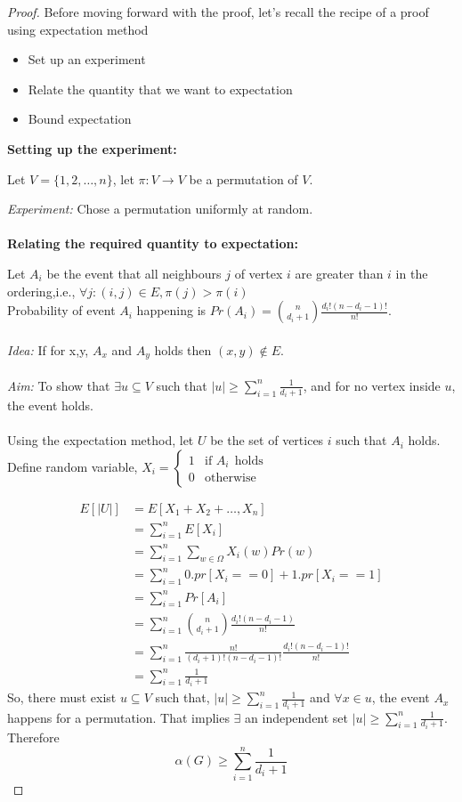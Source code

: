 \begin{proof}
Before moving forward with the proof, let's recall the recipe of a proof using expectation method
\begin{itemize}
  \item Set up an experiment
  \item Relate the quantity that we want to expectation
  \item Bound expectation
\end{itemize}
\textbf{Setting up the experiment:}

Let $V=\{1,2,\dots,n\}$, let $\pi:V\rightarrow V$ be a permutation of $V$.

\textit{Experiment:} Chose a permutation uniformly at random.\\\\
\textbf{Relating the required quantity to expectation:}

Let $A_i$ be the event that all neighbours $j$ of vertex $i$ are greater than $i$ in the ordering,i.e., $\forall j:(i,j)\in E, \pi(j)>\pi(i)$\\
Probability of event $A_i$ happening is $Pr(A_i)=\binom{n}{d_i+1}\frac{d_i!(n-d_i-1)!}{n!}$.\\\\
\textit{Idea:} If for x,y, $A_x$ and $A_y$ holds then $(x,y)\notin E$.\\\\
\textit{Aim:} To show that $\exists u\subseteq V$ such that $|u|\ge\sum_{i=1}^{n}\frac{1}{d_i+1}$, and for no vertex inside $u$, the event holds.\\\\
Using the expectation method, let $U$ be the set of vertices $i$ such that $A_i$ holds.\\
Define random variable,
$X_i =
\left\{
	\begin{array}{ll}
		1  & \mbox{if } A_i ~~\text{holds} \\
		0  & \mbox{otherwise }
	\end{array}
\right.$

\begin{align*}
    E[|U|] &= E[X_1+X_2+\dots,X_n]\\
           &= \sum_{i=1}^{n}E[X_i] \\
           &= \sum_{i=1}^{n}\sum_{w\in\Omega}X_i(w)Pr(w) \\
           &= \sum_{i=1}^{n}0.pr[X_i==0]+1.pr[X_i==1] \\
           &= \sum_{i=1}^{n}Pr[A_i] \\
           &= \sum_{i=1}^{n}\binom{n}{d_i+1}\frac{d_i!(n-d_i-1)}{n!}\\
           &= \sum_{i=1}^{n}\frac{n!}{(d_i+1)!(n-d_i-1)!}\frac{d_i!(n-d_i-1)!}{n!}\\
           &= \sum_{i=1}^{n}\frac{1}{d_i+1}
\end{align*}
So, there must exist $u\subseteq V$ such that, $|u|\ge \sum_{i=1}^{n}\frac{1}{d_i+1}$ and $\forall x \in u$, the event $A_x$ happens for a permutation. That implies $\exists$ an independent set $|u|\ge\sum_{i=1}^{n}\frac{1}{d_i+1}$. Therefore $$\alpha(G)\ge \sum_{i=1}^{n}\frac{1}{d_i+1}$$
\end{proof}
